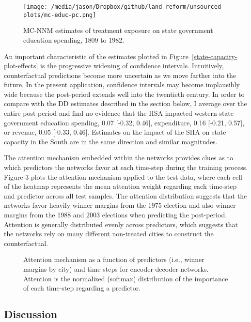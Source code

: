 \documentclass[hidelinks,12pt]{article}
\begin{document}
\begin{figure}[htbp]
	\centering
	\texttt{[image: /media/jason/Dropbox/github/land-reform/unsourced-plots/mc-educ-pc.png]}
	\caption{MC-NNM estimates of treatment exposure on state government education spending, 1809 to 1982.\label{mc-educ-pc}} 
\end{figure}

An important characteristic of the estimates plotted in Figure~\ref{state-capacity-plot-effects} is the progressive widening of confidence intervals. Intuitively, counterfactual predictions become more uncertain as we move farther into the future. In the present application, confidence intervals may become implausibly wide because the post-period extends well into the twentieth century. In order to compare with the DD estimates described in the section below, I average over the entire post-period and find no evidence that the HSA impacted western state government education spending, 0.07 [-0.32, 0.46], expenditure, 0.16 [-0.21, 0.57], or revenue, 0.05 [-0.33, 0.46]. Estimates on the impact of the SHA on state capacity in the South are in the same direction and similar magnitudes. 

The attention mechanism embedded within the networks provides clues as to which predictors the networks favor at each time-step during the training process. Figure 3 plots the attention mechanism applied to the test data, where each cell of the heatmap represents the mean attention weight regarding each time-step and predictor across all test samples. The attention distribution suggests that the networks favor heavily winner margins from the 1975 election and also winner margins from the 1988 and 2003 elections when predicting the post-period. Attention is generally distributed evenly across predictors, which suggests that the networks rely on many different non-treated cities to construct the counterfactual.

\begin{figure}[htbp]
	\centering
	\caption{Attention mechanism as a function of predictors (i.e., winner margins by city) and time-steps for encoder-decoder
		networks. Attention is the normalized (softmax) distribution of the importance of each time-step regarding a predictor.\label{attn-plot}} 
\end{figure}

\subsection{Discussion}
\end{document}

